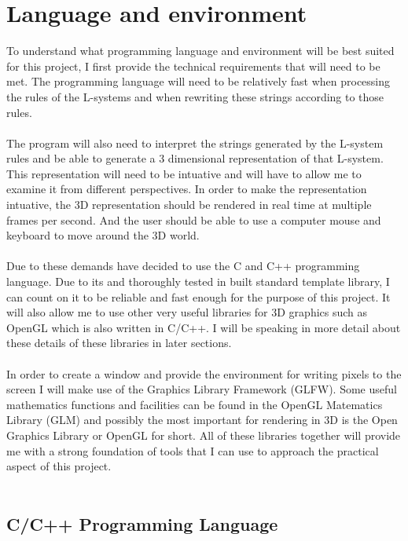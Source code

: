 \section{Language and environment}

To understand what programming language and environment will be best suited for this project, I first  provide the technical requirements that will need to be met. The programming language will need to be  relatively fast when processing the rules of the L-systems and when rewriting these strings according to those rules. \\
\\
The program will also need to interpret the strings generated by the L-system rules and be able to generate a 3 dimensional representation of that L-system. This representation will need to be intuative and will have to allow me to examine it from different perspectives. In order to make the representation intuative, the 3D representation should be rendered in real time at multiple frames per second. And the user should be able to use a computer mouse and keyboard to move around the 3D world. \\ 
\\
Due to these demands have decided to use the C and C++ programming language. Due to its and thoroughly tested in built standard template library, I can count on it to be reliable and fast enough for the purpose of this project. It will also allow me to use other very useful libraries for 3D graphics such as OpenGL which is also written in C/C++. I will be speaking in more detail about these details of these libraries in later sections. \\
\\
In order to create a window and provide the environment for writing pixels to the screen I will make use of the Graphics Library Framework (GLFW). Some useful mathematics functions and facilities can be found in the OpenGL Matematics Library (GLM) and possibly the most important for rendering in 3D is the Open Graphics Library or OpenGL for short. All of these libraries together will provide me with a strong foundation of tools that I can use to approach the practical aspect of this project. \\
\\
 

\subsection{C/C++ Programming Language}

